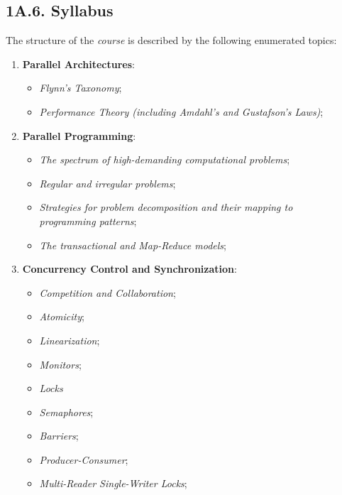 \subsection*{\large{\textbf{1A.6. Syllabus}}}
\label{ssec:lecture-1A6}

\noindent The structure of the \emph{course} is described by the following enumerated topics:

\begin{enumerate}
    \item \textbf{Parallel Architectures}:
    \begin{itemize}
        \vspace{-0.2cm}
        \item \emph{Flynn's Taxonomy};
        \item \emph{Performance Theory (including Amdahl's and Gustafson's Laws)};
    \end{itemize}
    \item \textbf{Parallel Programming}:
    \begin{itemize}
        \vspace{-0.2cm}
        \item \emph{The spectrum of high-demanding computational problems};
        \item \emph{Regular and irregular problems};
        \item \emph{Strategies for problem decomposition and their mapping to\\programming patterns};
        \item \emph{The transactional and Map-Reduce models};
    \end{itemize}
    \newpage
    \item \textbf{Concurrency Control and Synchronization}:
    \begin{itemize}
        \vspace{-0.2cm}
        \item \emph{Competition and Collaboration};
        \item \emph{Atomicity};
        \item \emph{Linearization};
        \item \emph{Monitors};
        \item \emph{Locks}
        \item \emph{Semaphores};
        \item \emph{Barriers};
        \item \emph{Producer-Consumer};
        \item \emph{Multi-Reader Single-Writer Locks};

\end{itemize}
\end{enumerate}
